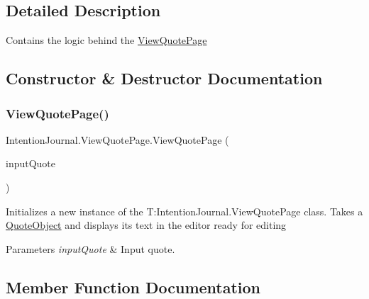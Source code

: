 \subsection{Detailed Description}
Contains the logic behind the \hyperlink{class_intention_journal_1_1_view_quote_page}{View\+Quote\+Page} 



\subsection{Constructor \& Destructor Documentation}
\mbox{\label{class_intention_journal_1_1_view_quote_page_a3c37e804a7934e234c0e7002c52d5fe0}} 
\subsubsection{\texorpdfstring{View\+Quote\+Page()}{ViewQuotePage()}}
{\footnotesize\ttfamily Intention\+Journal.\+View\+Quote\+Page.\+View\+Quote\+Page (\begin{DoxyParamCaption}\item[{\hyperlink{class_intention_journal_1_1_quote_object}{Quote\+Object}}]{input\+Quote }\end{DoxyParamCaption})\hspace{0.3cm}{\ttfamily [inline]}}



Initializes a new instance of the T\+:\+Intention\+Journal.\+View\+Quote\+Page class. Takes a \hyperlink{class_intention_journal_1_1_quote_object}{Quote\+Object} and displays its text in the editor ready for editing 


\begin{DoxyParams}{Parameters}
{\em input\+Quote} & Input quote.\\
\hline
\end{DoxyParams}


\subsection{Member Function Documentation}
\mbox{\label{class_intention_journal_1_1_view_quote_page_ac1f63f1b2d83332d872d3187dd0249c1}} 
